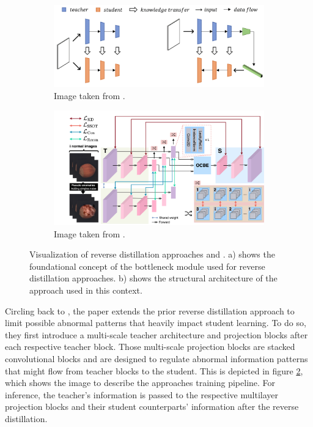 \begin{figure}[H]
 \captionsetup[subfigure]{justification=centering}
\centering
 \begin{subfigure}[b]{0.4\textwidth} %
 \centering
 \includegraphics[width=\textwidth]{figures/revdist_bottleneck.png}
 \caption{Image taken from \cite{Deng_2022basicrevdist}.}
 \label{fig:revdistbottleneck}
 \end{subfigure}
 \hspace{0.05\textwidth} %
 \begin{subfigure}[b]{0.4\textwidth} %
 \centering
 \includegraphics[width=\textwidth]{figures/revdistpipeline.png}
 \caption{Image taken from \cite{revdist2023}.}
 \label{fig:revdistpipeline}
 \end{subfigure}
 
 \caption{Visualization of reverse distillation approaches \cite{Deng_2022basicrevdist} and \cite{revdist2023}. a) shows 
 the foundational concept of the bottleneck module used for reverse distillation approaches. b) shows the structural 
architecture of the approach used in this context.}
\label{fig:revdistviz}
\end{figure}


Circling back to \cite{revdist2023}, the paper extends the prior reverse distillation approach to limit possible abnormal patterns that heavily impact student learning. To do so, they 
first introduce a multi-scale teacher architecture and projection blocks after each respective teacher block. Those multi-scale projection blocks are stacked convolutional blocks 
and are designed to regulate abnormal information patterns that might flow from teacher blocks to the student. This is depicted in figure \ref{fig:revdistpipeline}, which shows the image to describe the 
approaches training pipeline. For inference, the teacher's information is passed to the respective multilayer projection blocks and their student counterparts' information after the 
reverse distillation.



